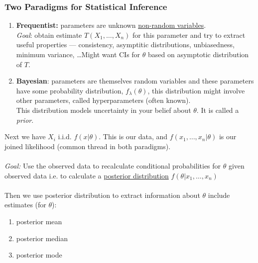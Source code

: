 \subsubsection*{Two Paradigms for Statistical Inference}
\begin{enumerate}[label=\protect\circled{\arabic*}]
	\item \textbf{Frequentist:} parameters are unknown \underline{non-random variables}.\\ \emph{Goal}: obtain estimate $T(X_1, \ldots, X_n)$ for this parameter and try to extract useful properties — consistency, asymptitic distributions, unbiasedness, minimum variance, \ldots Might want CIs for $\theta$ based on asymptotic distribution of $T$.
	\item \textbf{Bayesian}: parameters are themselves random variables and these parameters have some probability distribution, $f_\lambda(\theta)$, this distribution might involve other parameters, called hyperparameters (often known).\\ This distribution models uncertainty in your belief about $\theta$. It is called a \emph{prior}.\\
\end{enumerate}
Next we have $X_i$ i.i.d. $f(x | \theta)$. This is our data, and $f(x_1, \ldots, x_n | \theta)$ is our joined likelihood (common thread in both paradigms).\\\\
\emph{Goal:} Use the observed data to recalculate conditional probabilities for $\theta$ given observed data i.e. to calculate a \underline{posterior distribution} $f(\theta | x_1, \ldots, x_n)$\\\\
Then we use posterior distribution to extract information about $\theta$ include estimates (for $\theta$):
\begin{enumerate}
	\item posterior mean
	\item posterior median
	\item posterior mode
\end{enumerate}

